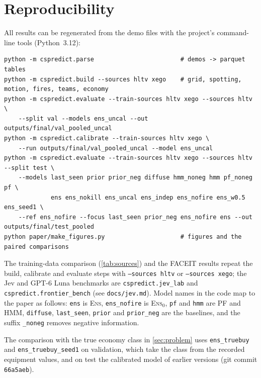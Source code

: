\documentclass[11pt]{article}
\newcommand{\model}[1]{\textsc{#1}}
\newcommand{\1}{\mathbb{1}}
\begin{document}
\section{Reproducibility}
\label{app:repro}
All results can be regenerated from the demo files with the project's command-line tools (Python~3.12):
{\footnotesize
\begin{verbatim}
python -m cspredict.parse                        # demos -> parquet tables
python -m cspredict.build --sources hltv xego    # grid, spotting, motion, fires, teams, economy
python -m cspredict.evaluate --train-sources hltv xego --sources hltv \
    --split val --models ens_uncal --out outputs/final/val_pooled_uncal
python -m cspredict.calibrate --train-sources hltv xego \
    --run outputs/final/val_pooled_uncal --model ens_uncal
python -m cspredict.evaluate --train-sources hltv xego --sources hltv --split test \
    --models last_seen prior prior_neg diffuse hmm_noneg hmm pf_noneg pf \
             ens ens_nokill ens_uncal ens_indep ens_nofire ens_w0.5 ens_seed1 \
    --ref ens_nofire --focus last_seen prior_neg ens_nofire ens --out outputs/final/test_pooled
python paper/make_figures.py                     # figures and the paired comparisons
\end{verbatim}
}
The training-data comparison (\cref{tab:sources}) and the FACEIT results repeat the build, calibrate and evaluate steps with \texttt{--sources hltv} or \texttt{--sources xego}; the Jev and GPT-6 Luna benchmarks are \texttt{cspredict.jev\_lab} and \texttt{cspredict.frontier\_bench} (see \texttt{docs/jev.md}). Model names in the code map to the paper as follows: \texttt{ens} is \model{Ens}, \texttt{ens\_nofire} is \model{Ens$_0$}, \texttt{pf} and \texttt{hmm} are \model{PF} and \model{HMM}, \texttt{diffuse}, \texttt{last\_seen}, \texttt{prior} and \texttt{prior\_neg} are the baselines, and the suffix \texttt{\_noneg} removes negative information.

The comparison with the true economy class in \cref{sec:problem} uses \texttt{ens\_truebuy} and \texttt{ens\_truebuy\_seed1} on validation, which take the class from the recorded equipment values, and on test the calibrated model of earlier versions (git commit \texttt{66a5aeb}).
\end{document}
